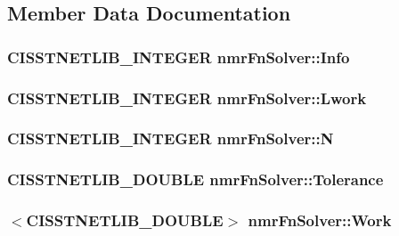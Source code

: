 \subsection{Member Data Documentation}
\hypertarget{classnmr_fn_solver_a2c7acbdbe21f78d6e26b82fa502a9935}{
\subsubsection[{Info}]{\setlength{\rightskip}{0pt plus 5cm}C\-I\-S\-S\-T\-N\-E\-T\-L\-I\-B\-\_\-\-I\-N\-T\-E\-G\-E\-R nmr\-Fn\-Solver\-::\-Info\hspace{0.3cm}{\ttfamily [protected]}}}\label{classnmr_fn_solver_a2c7acbdbe21f78d6e26b82fa502a9935}
\hypertarget{classnmr_fn_solver_a713fa3d60bd31f757d9c3cf04fc8f6c8}{
\subsubsection[{Lwork}]{\setlength{\rightskip}{0pt plus 5cm}C\-I\-S\-S\-T\-N\-E\-T\-L\-I\-B\-\_\-\-I\-N\-T\-E\-G\-E\-R nmr\-Fn\-Solver\-::\-Lwork\hspace{0.3cm}{\ttfamily [protected]}}}\label{classnmr_fn_solver_a713fa3d60bd31f757d9c3cf04fc8f6c8}
\hypertarget{classnmr_fn_solver_a19a2ba2ba0e6e1f4ddd7eb137550c1d8}{
\subsubsection[{N}]{\setlength{\rightskip}{0pt plus 5cm}C\-I\-S\-S\-T\-N\-E\-T\-L\-I\-B\-\_\-\-I\-N\-T\-E\-G\-E\-R nmr\-Fn\-Solver\-::\-N\hspace{0.3cm}{\ttfamily [protected]}}}\label{classnmr_fn_solver_a19a2ba2ba0e6e1f4ddd7eb137550c1d8}
\hypertarget{classnmr_fn_solver_acde9b05d6fb9fbc8aad45b2cbf63f6b6}{
\subsubsection[{Tolerance}]{\setlength{\rightskip}{0pt plus 5cm}C\-I\-S\-S\-T\-N\-E\-T\-L\-I\-B\-\_\-\-D\-O\-U\-B\-L\-E nmr\-Fn\-Solver\-::\-Tolerance\hspace{0.3cm}{\ttfamily [protected]}}}\label{classnmr_fn_solver_acde9b05d6fb9fbc8aad45b2cbf63f6b6}
\hypertarget{classnmr_fn_solver_ac641a0ef17a172725774a7b5703f95aa}{
\subsubsection[{Work}]{$<$C\-I\-S\-S\-T\-N\-E\-T\-L\-I\-B\-\_\-\-D\-O\-U\-B\-L\-E$>$ nmr\-Fn\-Solver\-::\-Work\hspace{0.3cm}{\ttfamily [protected]}}}\label{classnmr_fn_solver_ac641a0ef17a172725774a7b5703f95aa}


